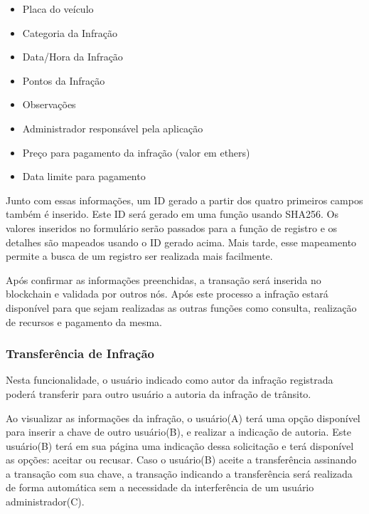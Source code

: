         \begin{itemize}
            \item Placa do veículo
            \item Categoria da Infração
            \item Data/Hora da Infração
            \item Pontos da Infração
            \item Observações
            \item Administrador responsável pela aplicação
            \item Preço para pagamento da infração (valor em ethers)
            \item Data limite para pagamento
        \end{itemize}
    
        Junto com essas informações, um ID gerado a partir dos quatro primeiros campos também é inserido. Este ID será gerado em uma função usando SHA256. Os valores inseridos no formulário serão passados para a função de registro e os detalhes são mapeados usando o ID gerado acima. Mais tarde, esse mapeamento permite a busca de um registro ser realizada mais facilmente.
        
        Após confirmar as informações preenchidas, a transação será inserida no blockchain e validada por outros nós. Após este processo a infração estará disponível para que sejam realizadas as outras funções como consulta, realização de recursos e pagamento da mesma.
        
            
    \subsubsection{Transferência de Infração}
    
        Nesta funcionalidade, o usuário indicado como autor da infração registrada poderá transferir para outro usuário a autoria da infração de trânsito.
        
        Ao visualizar as informações da infração, o usuário(A) terá uma opção disponível para inserir a chave de outro usuário(B), e realizar a indicação de autoria. Este usuário(B) terá em sua página uma indicação dessa solicitação e terá disponível as opções: aceitar ou recusar. Caso o usuário(B) aceite a transferência assinando a transação com sua chave, a transação indicando a transferência será realizada de forma automática sem a necessidade da interferência de um usuário administrador(C).
    
